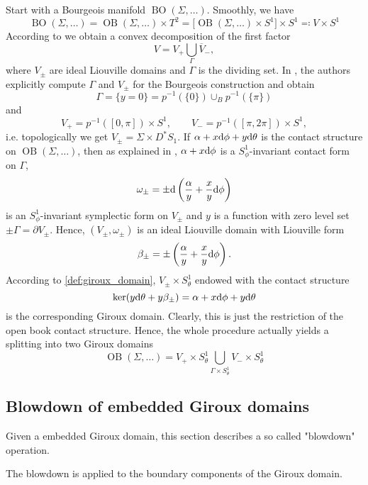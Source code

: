 Start with a Bourgeois manifold $\operatorname{BO}(\Sigma,\dots)$.
Smoothly, we have
\[
    \operatorname{BO}(\Sigma,\dots) = \operatorname{OB}(\Sigma, \dots) \times T^2 
    = \big[\operatorname{OB}(\Sigma, \dots) \times S^1\big] \times S^1 
    \eqqcolon V \times S^1
\]
According to \cite[Section 6]{DG12} we obtain a convex decomposition of the first factor
\[
    V = V_+ \bigcup_\Gamma \overline{V}_-,
\]
where $V_\pm$ are ideal Liouville domains and $\Gamma$ is the dividing set.
In \cite[Section 5.3]{DG12}, the authors explicitly compute $\Gamma$ and $V_\pm$ for the Bourgeois
construction and obtain %
\[
    \Gamma = \{y = 0\} = p^{-1}(\{0\}) \cup_B p^{-1}(\{\pi\})
\]
and
\[
    V_+ = p^{-1}([0, \pi]) \times S^1, \qquad V_- = p^{-1}([\pi, 2\pi]) \times S^1,
\]
i.e. topologically we get $V_\pm = \Sigma \times D^*S_1$.
If $\alpha + x \mathrm{d} \phi + y \mathrm{d} \theta$ is the contact structure on $\operatorname{OB}(\Sigma, \dots)$,
then as explained in \cite[Section 5.3]{DG12}, $\alpha + x \mathrm{d} \phi$ is a 
$S^1_\phi$-invariant contact form on $\Gamma$,
\[
    \omega_\pm = \pm \mathrm{d} \left(\frac{\alpha}{y} + \frac{x}{y}\mathrm{d} \phi\right) 
\]
is an $S^1_\phi$-invariant symplectic form on $V_\pm$ and
$y$ is a function with zero level set $\pm \Gamma = \partial V_\pm$.
Hence, $(V_\pm, \omega_\pm)$ is an ideal Liouville domain with Liouville form
\[
    \beta_\pm = \pm \left(\frac{\alpha}{y} + \frac{x}{y}\mathrm{d} \phi\right).
\]
According to \cref{def:giroux_domain}, $V_\pm \times S^1_\theta$
endowed with the contact structure 
\[
    \ker(y \mathrm{d} \theta + y \beta_\pm) = \alpha + x \mathrm{d} \phi + y \mathrm{d} \theta
\]
is the corresponding Giroux domain. Clearly, this is just the restriction
of the open book contact structure. Hence, the whole procedure actually yields a
splitting into two Giroux domains
\[
    \operatorname{OB}(\Sigma, \dots) = V_+ \times S^1_\theta 
    \bigcup_{\Gamma \times S^1_\theta} V_- \times S^1_\theta
\]

\subsection*{Blowdown of embedded Giroux domains}
Given a embedded Giroux domain, this section describes a
so called "blowdown" operation.

The blowdown is applied to the boundary components of the Giroux domain.
